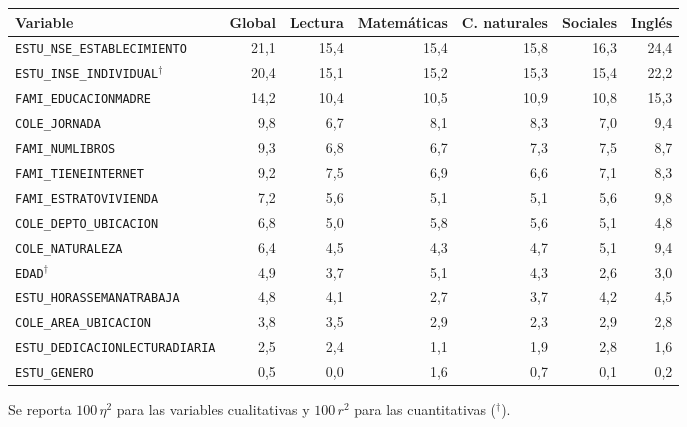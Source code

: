 \begingroup\tiny{}
\par
\noindent\begin{minipage}{\textwidth}
\centering
{}\label{tab:asociacion}
\begin{tabular}{l r r r r r r}
  \toprule
  \textbf{Variable} & \textbf{Global} & \textbf{Lectura} & \textbf{Matemáticas} & \textbf{C. naturales} & \textbf{Sociales} & \textbf{Inglés} \\
  \midrule

  \texttt{ESTU\_NSE\_ESTABLECIMIENTO} & 21,1 & 15,4 & 15,4 & 15,8 & 16,3 & 24,4 \\
  \texttt{ESTU\_INSE\_INDIVIDUAL}$^\dagger$ & 20,4 & 15,1 & 15,2 & 15,3 & 15,4 & 22,2 \\
  \texttt{FAMI\_EDUCACIONMADRE} & 14,2 & 10,4 & 10,5 & 10,9 & 10,8 & 15,3 \\
  \texttt{COLE\_JORNADA} & 9,8 & 6,7 & 8,1 & 8,3 & 7,0 & 9,4 \\
  \texttt{FAMI\_NUMLIBROS} & 9,3 & 6,8 & 6,7 & 7,3 & 7,5 & 8,7 \\
  \texttt{FAMI\_TIENEINTERNET} & 9,2 & 7,5 & 6,9 & 6,6 & 7,1 & 8,3 \\
  \texttt{FAMI\_ESTRATOVIVIENDA} & 7,2 & 5,6 & 5,1 & 5,1 & 5,6 & 9,8 \\
  \texttt{COLE\_DEPTO\_UBICACION} & 6,8 & 5,0 & 5,8 & 5,6 & 5,1 & 4,8 \\
  \texttt{COLE\_NATURALEZA} & 6,4 & 4,5 & 4,3 & 4,7 & 5,1 & 9,4 \\
  \texttt{EDAD}$^\dagger$ & 4,9 & 3,7 & 5,1 & 4,3 & 2,6 & 3,0 \\
  \texttt{ESTU\_HORASSEMANATRABAJA} & 4,8 & 4,1 & 2,7 & 3,7 & 4,2 & 4,5 \\
  \texttt{COLE\_AREA\_UBICACION} & 3,8 & 3,5 & 2,9 & 2,3 & 2,9 & 2,8 \\
  \texttt{ESTU\_DEDICACIONLECTURADIARIA} & 2,5 & 2,4 & 1,1 & 1,9 & 2,8 & 1,6 \\
  \texttt{ESTU\_GENERO} & 0,5 & 0,0 & 1,6 & 0,7 & 0,1 & 0,2 \\
  \bottomrule
\end{tabular}
\par\raggedright{\footnotesize Se reporta $100\,\eta^2$ para las variables cualitativas y $100\,r^2$ para las cuantitativas ($^\dagger$).\par}
\end{minipage}
\par
\endgroup
